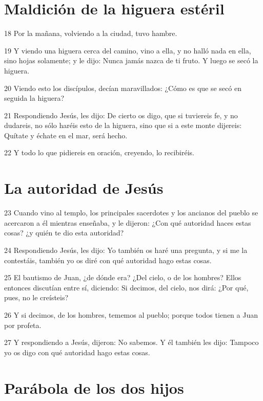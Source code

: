 \section*{Maldición de la higuera estéril}

\par 18 Por la mañana, volviendo a la ciudad, tuvo hambre.
\par 19 Y viendo una higuera cerca del camino, vino a ella, y no halló nada en ella, sino hojas solamente; y le dijo: Nunca jamás nazca de ti fruto. Y luego se secó la higuera.
\par 20 Viendo esto los discípulos, decían maravillados: ¿Cómo es que se secó en seguida la higuera?
\par 21 Respondiendo Jesús, les dijo: De cierto os digo, que si tuviereis fe, y no dudareis, no sólo haréis esto de la higuera, sino que si a este monte dijereis: Quítate y échate en el mar, será hecho.
\par 22 Y todo lo que pidiereis en oración, creyendo, lo recibiréis.

\section*{La autoridad de Jesús}

\par 23 Cuando vino al templo, los principales sacerdotes y los ancianos del pueblo se acercaron a él mientras enseñaba, y le dijeron: ¿Con qué autoridad haces estas cosas? ¿y quién te dio esta autoridad?
\par 24 Respondiendo Jesús, les dijo: Yo también os haré una pregunta, y si me la contestáis, también yo os diré con qué autoridad hago estas cosas.
\par 25 El bautismo de Juan, ¿de dónde era? ¿Del cielo, o de los hombres? Ellos entonces discutían entre sí, diciendo: Si decimos, del cielo, nos dirá: ¿Por qué, pues, no le creísteis?
\par 26 Y si decimos, de los hombres, tememos al pueblo; porque todos tienen a Juan por profeta.
\par 27 Y respondiendo a Jesús, dijeron: No sabemos. Y él también les dijo: Tampoco yo os digo con qué autoridad hago estas cosas.

\section*{Parábola de los dos hijos}

